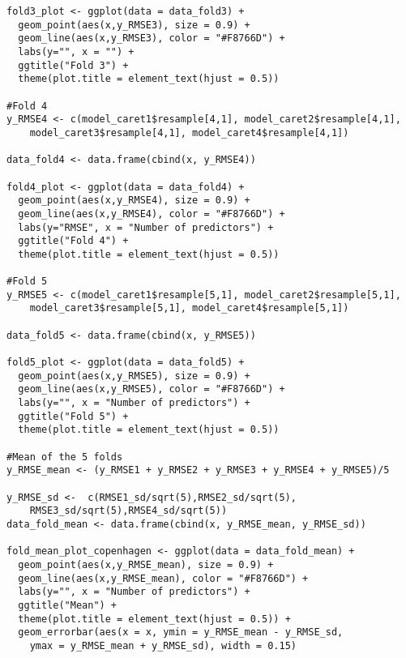 \begin{lstlisting}
fold3_plot <- ggplot(data = data_fold3) + 
  geom_point(aes(x,y_RMSE3), size = 0.9) + 
  geom_line(aes(x,y_RMSE3), color = "#F8766D") + 
  labs(y="", x = "") +
  ggtitle("Fold 3") +
  theme(plot.title = element_text(hjust = 0.5))

#Fold 4
y_RMSE4 <- c(model_caret1$resample[4,1], model_caret2$resample[4,1], 
    model_caret3$resample[4,1], model_caret4$resample[4,1])

data_fold4 <- data.frame(cbind(x, y_RMSE4))

fold4_plot <- ggplot(data = data_fold4) + 
  geom_point(aes(x,y_RMSE4), size = 0.9) + 
  geom_line(aes(x,y_RMSE4), color = "#F8766D") + 
  labs(y="RMSE", x = "Number of predictors") +
  ggtitle("Fold 4") +
  theme(plot.title = element_text(hjust = 0.5))

#Fold 5
y_RMSE5 <- c(model_caret1$resample[5,1], model_caret2$resample[5,1], 
    model_caret3$resample[5,1], model_caret4$resample[5,1])

data_fold5 <- data.frame(cbind(x, y_RMSE5))

fold5_plot <- ggplot(data = data_fold5) + 
  geom_point(aes(x,y_RMSE5), size = 0.9) + 
  geom_line(aes(x,y_RMSE5), color = "#F8766D") + 
  labs(y="", x = "Number of predictors") +
  ggtitle("Fold 5") +
  theme(plot.title = element_text(hjust = 0.5))

#Mean of the 5 folds
y_RMSE_mean <- (y_RMSE1 + y_RMSE2 + y_RMSE3 + y_RMSE4 + y_RMSE5)/5

y_RMSE_sd <-  c(RMSE1_sd/sqrt(5),RMSE2_sd/sqrt(5),
    RMSE3_sd/sqrt(5),RMSE4_sd/sqrt(5))
data_fold_mean <- data.frame(cbind(x, y_RMSE_mean, y_RMSE_sd))

fold_mean_plot_copenhagen <- ggplot(data = data_fold_mean) + 
  geom_point(aes(x,y_RMSE_mean), size = 0.9) + 
  geom_line(aes(x,y_RMSE_mean), color = "#F8766D") + 
  labs(y="", x = "Number of predictors") +
  ggtitle("Mean") +
  theme(plot.title = element_text(hjust = 0.5)) +
  geom_errorbar(aes(x = x, ymin = y_RMSE_mean - y_RMSE_sd, 
    ymax = y_RMSE_mean + y_RMSE_sd), width = 0.15)

\end{lstlisting}

